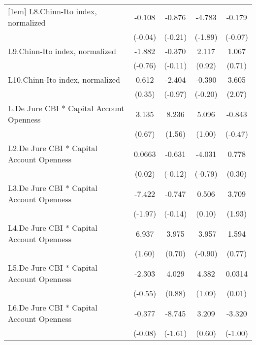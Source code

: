 {\begin{longtable}{l*{4}{c}}
[1em]
L8.Chinn-Ito index, normalized&   -0.108         &   -0.876         &   -4.783         &   -0.179         \\
                &  (-0.04)         &  (-0.21)         &  (-1.89)         &  (-0.07)         \\
[1em]
L9.Chinn-Ito index, normalized&   -1.882         &   -0.370         &    2.117         &    1.067         \\
                &  (-0.76)         &  (-0.11)         &   (0.92)         &   (0.71)         \\
[1em]
L10.Chinn-Ito index, normalized&    0.612         &   -2.404         &   -0.390         &    3.605\sym{*}  \\
                &   (0.35)         &  (-0.97)         &  (-0.20)         &   (2.07)         \\
[1em]
L.De Jure CBI * Capital Account Openness&    3.135         &    8.236         &    5.096         &   -0.843         \\
                &   (0.67)         &   (1.56)         &   (1.00)         &  (-0.47)         \\
[1em]
L2.De Jure CBI * Capital Account Openness&   0.0663         &   -0.631         &   -4.031         &    0.778         \\
                &   (0.02)         &  (-0.12)         &  (-0.79)         &   (0.30)         \\
[1em]
L3.De Jure CBI * Capital Account Openness&   -7.422\sym{*}  &   -0.747         &    0.506         &    3.709         \\
                &  (-1.97)         &  (-0.14)         &   (0.10)         &   (1.93)         \\
[1em]
L4.De Jure CBI * Capital Account Openness&    6.937         &    3.975         &   -3.957         &    1.594         \\
                &   (1.60)         &   (0.70)         &  (-0.90)         &   (0.77)         \\
[1em]
L5.De Jure CBI * Capital Account Openness&   -2.303         &    4.029         &    4.382         &   0.0314         \\
                &  (-0.55)         &   (0.88)         &   (1.09)         &   (0.01)         \\
[1em]
L6.De Jure CBI * Capital Account Openness&   -0.377         &   -8.745         &    3.209         &   -3.320         \\
                &  (-0.08)         &  (-1.61)         &   (0.60)         &  (-1.00)         \\

\end{longtable}}
